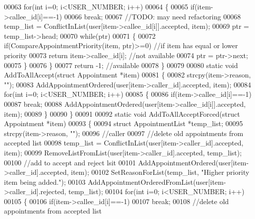 \begin{DoxyCode}
00063     \textcolor{keywordflow}{for}(\textcolor{keywordtype}{int} i=0; i<USER_NUMBER; i++)
00064     \{
00065         \textcolor{keywordflow}{if}(item->callee\_id[i]==-1)
00066             \textcolor{keywordflow}{break};
00067         \textcolor{comment}{//TODO: may need refactoring}
00068         temp\_list = ConflictInList(user[item->callee\_id[i]].accepted, item);
00069         ptr = temp\_list->head;
00070         \textcolor{keywordflow}{while}(ptr)
00071         \{
00072             \textcolor{keywordflow}{if}(CompareAppointmentPriority(item, ptr)>=0)    \textcolor{comment}{//if item has equal or lower priority}
00073                 \textcolor{keywordflow}{return} item->callee\_id[i];  \textcolor{comment}{//not available}
00074             ptr = ptr->next;
00075         \}
00076     \}
00077     \textcolor{keywordflow}{return} -1;  \textcolor{comment}{//available}
00078 \}
00079 
00080 \textcolor{keyword}{static} \textcolor{keywordtype}{void} AddToAllAccept(\textcolor{keyword}{struct} Appointment *item)
00081 \{
00082     strcpy(item->reason, \textcolor{stringliteral}{""});
00083     AddAppointmentOrdered(user[item->caller\_id].accepted, item);
00084     \textcolor{keywordflow}{for}(\textcolor{keywordtype}{int} i=0; i<USER_NUMBER; i++)
00085     \{
00086         \textcolor{keywordflow}{if}(item->callee\_id[i]==-1)
00087             \textcolor{keywordflow}{break};
00088         AddAppointmentOrdered(user[item->callee\_id[i]].accepted, item);
00089     \}
00090 \}
00091 
00092 \textcolor{keyword}{static} \textcolor{keywordtype}{void} AddToAllAcceptForced(\textcolor{keyword}{struct} Appointment *item)
00093 \{
00094     \textcolor{keyword}{struct }AppointmentList *temp\_list;
00095     strcpy(item->reason, \textcolor{stringliteral}{""});
00096     \textcolor{comment}{//caller}
00097     \textcolor{comment}{//delete old appointments from accepted list}
00098     temp\_list = ConflictInList(user[item->caller\_id].accepted, item);
00099     RemoveListFromList(user[item->caller\_id].accepted, temp\_list);
00100     \textcolor{comment}{//add to accept and reject lsit}
00101     AddAppointmentOrdered(user[item->caller\_id].accepted, item);
00102     SetReasonForList(temp\_list, \textcolor{stringliteral}{"Higher priority item being added."});
00103     AddAppointmentOrderedFromList(user[item->caller\_id].rejected, temp\_list);
00104     \textcolor{keywordflow}{for}(\textcolor{keywordtype}{int} i=0; i<USER_NUMBER; i++)
00105     \{
00106         \textcolor{keywordflow}{if}(item->callee\_id[i]==-1)
00107             \textcolor{keywordflow}{break};
00108         \textcolor{comment}{//delete old appointments from accepted list}

\end{DoxyCode}
